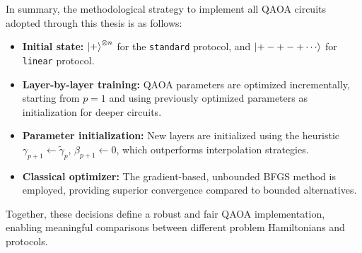 
\pagebreak

In summary, the methodological strategy to implement all QAOA circuits adopted through this thesis is as follows:
\begin{itemize}
    \item \textbf{Initial state:} $\ket{+}^{\otimes n}$ for the \texttt{standard} protocol, and $\ket{+-+-+\cdots}$ for \texttt{linear} protocol. 
    \item \textbf{Layer-by-layer training:} QAOA parameters are optimized incrementally, starting from $p=1$ and using previously optimized parameters as initialization for deeper circuits.  
    \item \textbf{Parameter initialization:} New layers are initialized using the heuristic $\gamma_{p+1} \leftarrow \widetilde{\gamma}_p$, $\beta_{p+1} \leftarrow 0$, which outperforms interpolation strategies.  
    \item \textbf{Classical optimizer:} The gradient-based, unbounded BFGS method is employed, providing superior convergence compared to bounded alternatives.  
\end{itemize}

Together, these decisions define a robust and fair QAOA implementation, enabling meaningful comparisons between different problem Hamiltonians and protocols.
